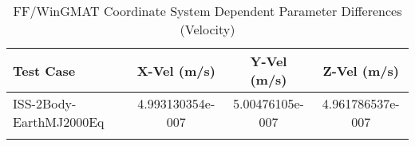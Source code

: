 \begin{table}[htbp!]
\centering
\caption{ FF/WinGMAT Coordinate System Dependent Parameter Differences (Velocity)}
      \begin{tabular}{lccc}
      \hline\hline
          Test Case & X-Vel (m/s) & Y-Vel (m/s) & Z-Vel (m/s) \\
         \hline
         ISS-2Body-EarthMJ2000Eq & 4.993130354e-007 & 5.00476105e-007 & 4.961786537e-007 \\
      \hline\hline
      \label{Table: FF-WinGMAT CS Parameters Set 2} 
\end{tabular}
\end{table}
